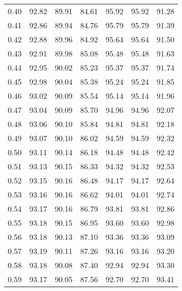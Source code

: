 \begin{tabular}{|c|c|c|c|c|c|c|}
      0.40 &     92.82 &     89.91 &      84.61 &   95.92 &      95.92 &         91.28 \\
      0.41 &     92.86 &     89.94 &      84.76 &   95.79 &      95.79 &         91.39 \\
      0.42 &     92.88 &     89.96 &      84.92 &   95.64 &      95.64 &         91.50 \\
      0.43 &     92.91 &     89.98 &      85.08 &   95.48 &      95.48 &         91.63 \\
      0.44 &     92.95 &     90.02 &      85.23 &   95.37 &      95.37 &         91.74 \\
      0.45 &     92.98 &     90.04 &      85.38 &   95.24 &      95.24 &         91.85 \\
      0.46 &     93.02 &     90.09 &      85.54 &   95.14 &      95.14 &         91.96 \\
      0.47 &     93.04 &     90.09 &      85.70 &   94.96 &      94.96 &         92.07 \\
      0.48 &     93.06 &     90.10 &      85.84 &   94.81 &      94.81 &         92.18 \\
      0.49 &     93.07 &     90.10 &      86.02 &   94.59 &      94.59 &         92.32 \\
      0.50 &     93.11 &     90.14 &      86.18 &   94.48 &      94.48 &         92.42 \\
      0.51 &     93.13 &     90.15 &      86.33 &   94.32 &      94.32 &         92.53 \\
      0.52 &     93.15 &     90.16 &      86.48 &   94.17 &      94.17 &         92.64 \\
      0.53 &     93.16 &     90.16 &      86.62 &   94.01 &      94.01 &         92.74 \\
      0.54 &     93.17 &     90.16 &      86.79 &   93.81 &      93.81 &         92.86 \\
      0.55 &     93.18 &     90.15 &      86.95 &   93.60 &      93.60 &         92.98 \\
      0.56 &     93.18 &     90.13 &      87.10 &   93.36 &      93.36 &         93.09 \\
      0.57 &     93.19 &     90.11 &      87.26 &   93.16 &      93.16 &         93.20 \\
      0.58 &     93.18 &     90.08 &      87.40 &   92.94 &      92.94 &         93.30 \\
      0.59 &     93.17 &     90.05 &      87.56 &   92.70 &      92.70 &         93.41 \\

\end{tabular}
